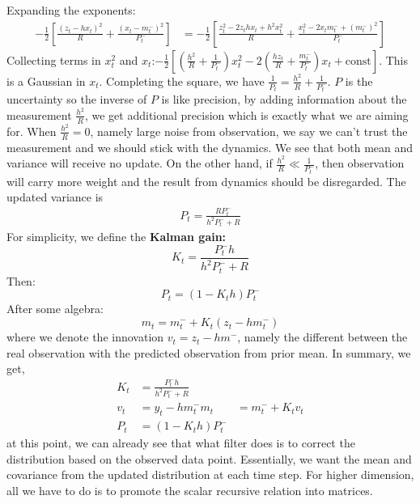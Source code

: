 \documentclass{article}
\begin{document}
Expanding the exponents:
\begin{align}
-\frac{1}{2}\left[\frac{(z_t - h x_t)^2}{R} + \frac{(x_t - m_t^-)^2}{P_t^-}\right] &= -\frac{1}{2}\left[\frac{z_t^2 - 2 z_t h x_t + h^2 x_t^2}{R} + \frac{x_t^2 - 2 x_t m_t^- + (m_t^-)^2}{P_t^-}\right]
\end{align}
Collecting terms in $x_t^2$ and $x_t$:$-\frac{1}{2}\left[\left(\frac{h^2}{R} + \frac{1}{P_t^-}\right) x_t^2 - 2\left(\frac{h z_t}{R} + \frac{m_t^-}{P_t^-}\right) x_t + \text{const}\right]$. 
This is a Gaussian in $x_t$. Completing the square, we have $\frac{1}{P_t} = \frac{h^2}{R} + \frac{1}{P_t^-}$. $P$ is the uncertainty so the inverse of $P$ is like precision, by adding information about the measurement $\frac{h^2}{R}$, we get additional precision which is exactly what we are aiming for. When $\frac{h^2}{R}=0$, namely large noise from observation, we say we can't trust the measurement and we should stick with the dynamics. We see that both mean and variance will receive no update. On the other hand, if $\frac{h^2}{R} \ll \frac{1}{P_t^-}$, then observation will carry more weight and the result from dynamics should be disregarded.
The updated variance is
\begin{align}
P_t = \frac{R P_t^-}{h^2 P_t^- + R}
\end{align}
For simplicity, we define the \textbf{Kalman gain:}
\begin{equation}
K_t = \frac{P_t^- h}{h^2 P_t^- + R}
\end{equation}
Then:
\begin{equation}
P_t = (1 - K_t h) P_t^-
\end{equation}
After some algebra:
\begin{equation}
m_t = m_t^- + K_t (z_t - h m_t^-)
\end{equation}
where we denote the innovation $v_t=z_t-hm^-$, namely the different between the real observation with the predicted observation from prior mean.
In summary, we get,
\begin{equation}
\boxed{
\begin{aligned}
K_t &= \frac{P_t^- h}{h^2 P_t^- + R} \\
v_t &= y_t - h m_t^-
m_t &= m_t^- + K_t v_t \\
P_t &= (1 - K_t h) P_t^-
\end{aligned}
}
\end{equation}
at this point, we can already see that what filter does is to correct the distribution based on the observed data point. Essentially, we want the mean and covariance from the updated distribution at each time step. For higher dimension, all we have to do is to promote the scalar recursive relation into matrices.  
\end{document}
